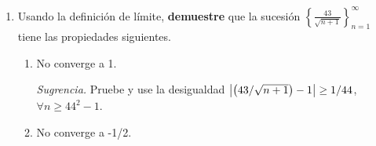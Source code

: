 \documentclass[12pt]{article}
\begin{document}
\begin{enumerate}
\begin{proof}
\begin{enumerate}
                Tome $\varepsilon_0 = \frac{1}{2}$, entonces para este epsilon existe un conjunto $J\subset\mathbb{N}$ no acotado, dado como
                \begin{equation*}
                    J=\left\{n\in\mathbb{N}|n\geq 2\right\}
                \end{equation*}
                tal que para todo $n\in J$ se tiene que
                \begin{equation*}
                    \abs{\left(\frac{2}{n^2}\right)-2}\geq\frac{1}{2}=\varepsilon_0
                \end{equation*}
                Luego, la sucesión no converge a 2.
                \item Sea $n\in\mathbb{N}$. Observemos que
                \begin{equation*}
                    \begin{split}
                        \abs{\frac{2}{n^2}+1}\geq& 1-\frac{2}{n^2}\\
                        \geq& 1-0\\
                        \geq& 1\\
                    \end{split}
                \end{equation*}
                Tome $\varepsilon_0=1$, entonces para este epsilon existe un conjunto $J=\left\{n\in\mathbb{N}|n\geq1\right\}$ no acotado tal que para todo $n\in J$ se tiene que
                \begin{equation*}
                    \abs{\frac{2}{n^2}+1}\geq1=\varepsilon_0
                \end{equation*}
                Luego, la sucesión no converge a 1.
                \item Sea $n\geq6$. Tenemos que
            \end{enumerate}
            \qed
        \end{proof}
    \item Usando la definición de límite, \textbf{demuestre} que la sucesión $\left\{\frac{43}{\sqrt{n+1}}\right\}_{n=1}^{\infty}$ tiene las propiedades siguientes.
        \begin{enumerate}
            \item No converge a 1.

                \textit{Sugrencia.} Pruebe y use la desigualdad $\left| \left(43/\sqrt{n+1}\right)-1 \right|\geq 1/44$, $\forall n\geq 44^2-1$.
            \item No converge a -1/2.


\end{enumerate}
\end{enumerate}
\end{document}
